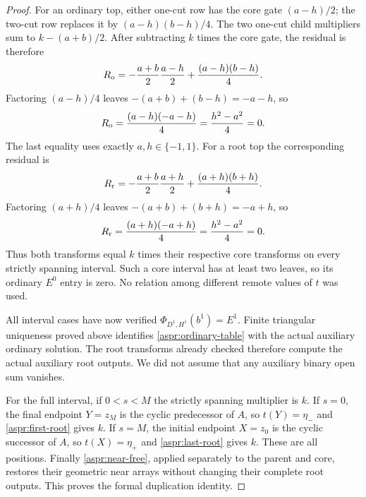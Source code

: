 \begin{proof}
For an ordinary top, either one-cut row has the core gate $(a-h)/2$;
the two-cut row replaces it by $(a-h)(b-h)/4$. The two one-cut child
multipliers sum to $k-(a+b)/2$. After subtracting $k$ times the core
gate, the residual is therefore
\begin{equation}\label{aspr:ordinary-residual}
R_{\rm o}=-\frac{a+b}{2}\frac{a-h}{2}
               +\frac{(a-h)(b-h)}4.
\end{equation}
Factoring $(a-h)/4$ leaves $-(a+b)+(b-h)=-a-h$, so
\begin{equation}\label{aspr:ordinary-factor}
R_{\rm o}=\frac{(a-h)(-a-h)}4=\frac{h^2-a^2}{4}=0.
\end{equation}
The last equality uses exactly $a,h\in\{-1,1\}$.
For a root top the corresponding residual is
\begin{equation}\label{aspr:root-residual}
R_{\rm r}=-\frac{a+b}{2}\frac{a+h}{2}
               +\frac{(a+h)(b+h)}4.
\end{equation}
Factoring $(a+h)/4$ leaves $-(a+b)+(b+h)=-a+h$, so
\begin{equation}\label{aspr:root-factor}
R_{\rm r}=\frac{(a+h)(-a+h)}4=\frac{h^2-a^2}{4}=0.
\end{equation}
Thus both transforms equal $k$ times their respective core transforms
on every strictly spanning interval. Such a core interval has at least
two leaves, so its ordinary $E^0$ entry is zero. No relation among
different remote values of $t$ was used.

All interval cases have now verified
$\Phi_{D^1,H^1}(b^1)=E^1$. Finite triangular uniqueness proved above
identifies \eqref{aspr:ordinary-table} with the actual auxiliary
ordinary solution. The root transforms already checked therefore
compute the actual auxiliary root outputs. We did not assume that any
auxiliary binary open sum vanishes.

For the full interval, if $0<s<M$ the strictly spanning multiplier is
$k$. If $s=0$, the final endpoint $Y=z_M$ is the cyclic predecessor of
$A$, so $t(Y)=\eta_-$ and \eqref{aspr:first-root} gives $k$. If $s=M$,
the initial endpoint $X=z_0$ is the cyclic successor of $A$, so
$t(X)=\eta_+$ and \eqref{aspr:last-root} gives $k$. These are all
positions. Finally \eqref{aspr:near-free}, applied separately to the
parent and core, restores their geometric near arrays without changing
their complete root outputs. This proves the formal duplication identity.


\end{proof}
